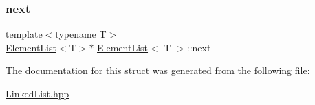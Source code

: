 \mbox{\label{struct_element_list_ae15f34d3109949237cf3ba98a074d402}} 
\subsubsection{\texorpdfstring{next}{next}}
{\footnotesize\ttfamily template$<$typename T$>$ \\
\mbox{\hyperlink{struct_element_list}{Element\+List}}$<$T$>$$\ast$ \mbox{\hyperlink{struct_element_list}{Element\+List}}$<$ T $>$\+::next}



The documentation for this struct was generated from the following file\+:\begin{DoxyCompactItemize}
\item 
\mbox{\hyperlink{_linked_list_8hpp}{Linked\+List.\+hpp}}\end{DoxyCompactItemize}
